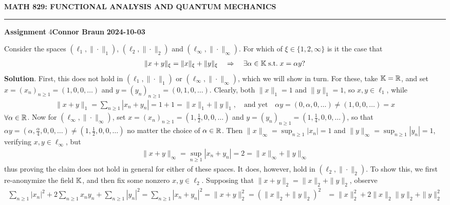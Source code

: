 \documentclass[10pt]{article}
\newcommand{\1}[1]{\mathbbm{1}_{#1}} \newcommand{\mc}[1]{\mathcal{#1}}
\begin{document}
    \begin{center}
        {\bf\large{MATH 829: FUNCTIONAL ANALYSIS AND QUANTUM MECHANICS}}
        \smallskip
        \hrule
        \smallskip
        {\bf Assignment} 4\hfill {\bf Connor Braun} \hfill {\bf 2024-10-03}
    \end{center}
    \vspace{5pt}
     Consider the spaces $(\ell_1,\|\cdot\|_1)$,
    $(\ell_2,\|\cdot\|_2)$ and $(\ell_\infty,\|\cdot\|_\infty)$. For which of
    $\xi\in\{1,2,\infty\}$ is it the case that
    \begin{align*}
        \|x+y\|_\xi=\|x\|_\xi+\|y\|_\xi\quad\Rightarrow\quad\exists\alpha\in\mathbb{K}\;\text{s.t.}\;x=\alpha y?
    \end{align*}
    {\bf Solution}. First, this does not hold in $(\ell_1,\|\cdot\|_1)$ or
    $(\ell_\infty,\|\cdot\|_\infty)$, which we will show in turn. For these,
    take $\mathbb{K}=\mathbb{R}$, and set $x=(x_n)_{n\geq 1}=(1,0,0,\dots)$ and
    $y=(y_n)_{n\geq 1}=(0,1,0,\dots)$. Clearly, both $\|x\|_1=1$ and
    $\|y\|_1=1$, so $x,y\in\ell_1$, while
    \begin{align*}
        \|x+y\|_1=\sum_{n\geq 1}|x_n+y_n|=1+1=\|x\|_1+\|y\|_1,\quad\text{and yet}\quad \alpha y=(0,\alpha,0,\dots)\neq (1,0,0,\dots)=x
    \end{align*}
    $\forall \alpha\in\mathbb{R}$. Now for $(\ell_\infty,\|\cdot\|_\infty)$, set
    $x=(x_n)_{n\geq 1}=(1,\tfrac{1}{2},0,0,\dots)$ and $y=(y_n)_{n\geq
    1}=(1,\tfrac{1}{4},0,0,\dots)$, so that $\alpha
    y=(\alpha,\tfrac{\alpha}{4},0,0,\dots)\neq(1,\tfrac{1}{2},0,0,\dots)$ no
    matter the choice of $\alpha\in\mathbb{R}$. Then $\|x\|_\infty=\sup_{n\geq
    1}|x_n|=1$ and $\|y\|_\infty=\sup_{n\geq 1}|y_n|=1$, verifying
    $x,y\in\ell_\infty$, but
    \begin{align*}
        \|x+y\|_\infty=\sup_{n\geq 1}|x_n+y_n|=2=\|x\|_\infty+\|y\|_\infty
    \end{align*}
    thus proving the claim does not hold in general for either of these spaces.
    It does, however, hold in $(\ell_2,\|\cdot\|_2)$. To show this, we first
    re-anonymize the field $\mathbb{K}$, and then fix some nonzero $x,y\in\ell_2$.
    Supposing that $\|x+y\|_2=\|x\|_2+\|y\|_2$, observe
    \begin{align*}
        \sum_{n\geq 1}|x_n|^2+2\sum_{n\geq 1}x_ny_n+\sum_{n\geq 1}|y_n|^2=\sum_{n\geq 1}|x_n+y_n|^2=\|x+y\|^2_2=(\|x\|_2+\|y\|_2)^2&=\|x\|^2_2+2\|x\|_2\|y\|_2+\|y\|_2^2
    \end{align*}
\end{document}
